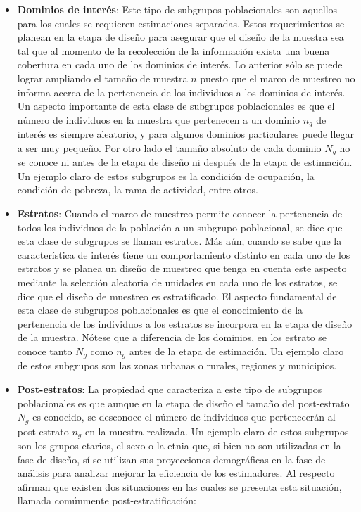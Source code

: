 \documentclass[12pt,spanish,]{book}
\begin{document}
\begin{itemize}
\item
  \textbf{Dominios de interés}: Este tipo de subgrupos poblacionales son aquellos para los cuales se requieren estimaciones separadas. Estos requerimientos se planean en la etapa de diseño para asegurar que el diseño de la muestra sea tal que al momento de la recolección de la información exista una buena cobertura en cada uno de los dominios de interés. Lo anterior sólo se puede lograr ampliando el tamaño de muestra \(n\) puesto que el marco de muestreo no informa acerca de la pertenencia de los individuos a los dominios de interés. Un aspecto importante de esta clase de subgrupos poblacionales es que el número de individuos en la muestra que pertenecen a un dominio \(n_g\) de interés es siempre aleatorio, y para algunos dominios particulares puede llegar a ser muy pequeño. Por otro lado el tamaño absoluto de cada dominio \(N_g\) no se conoce ni antes de la etapa de diseño ni después de la etapa de estimación. Un ejemplo claro de estos subgrupos es la condición de ocupación, la condición de pobreza, la rama de actividad, entre otros.
\item
  \textbf{Estratos}: Cuando el marco de muestreo permite conocer la pertenencia de todos los individuos de la población a un subgrupo poblacional, se dice que esta clase de subgrupos se llaman estratos. Más aún, cuando se sabe que la característica de interés tiene un comportamiento distinto en cada uno de los estratos y se planea un diseño de muestreo que tenga en cuenta este aspecto mediante la selección aleatoria de unidades en cada uno de los estratos, se dice que el diseño de muestreo es estratificado. El aspecto fundamental de esta clase de subgrupos poblacionales es que el conocimiento de la pertenencia de los individuos a los estratos se incorpora en la etapa de diseño de la muestra. Nótese que a diferencia de los dominios, en los estrato se conoce tanto \(N_g\) como \(n_g\) antes de la etapa de estimación. Un ejemplo claro de estos subgrupos son las zonas urbanas o rurales, regiones y municipios.
\item
  \textbf{Post-estratos}: La propiedad que caracteriza a este tipo de subgrupos poblacionales es que aunque en la etapa de diseño el tamaño del post-estrato \(N_g\) es conocido, se desconoce el número de individuos que pertenecerán al post-estrato \(n_g\) en la muestra realizada. Un ejemplo claro de estos subgrupos son los grupos etarios, el sexo o la etnia que, si bien no son utilizadas en la fase de diseño, sí se utilizan sus proyecciones demográficas en la fase de análisis para analizar mejorar la eficiencia de los estimadores. Al respecto \textcite{Sarndal_Swensson_Wretman_2003} afirman que existen dos situaciones en las cuales se presenta esta situación, llamada comúnmente post-estratificación:


\end{itemize}
\end{document}
